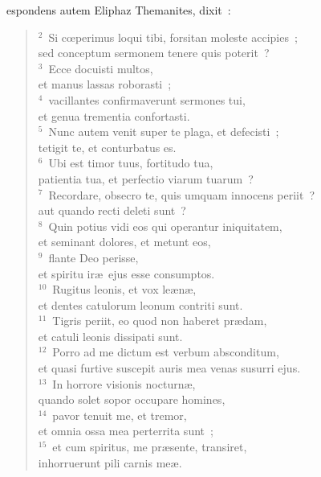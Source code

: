 \bchapter
{}espondens autem Eliphaz Themanites, dixit~:
\begin{flushleft}\begin{verse}\vspace{6pt}${}^{2}$~Si cœperimus loqui tibi, forsitan moleste accipies~;\\ sed conceptum sermonem tenere quis poterit~?\\
${}^{3}$~Ecce docuisti multos,\\ et manus lassas roborasti~;\\
${}^{4}$~vacillantes confirmaverunt sermones tui,\\ et genua trementia confortasti.\\
${}^{5}$~Nunc autem venit super te plaga, et defecisti~;\\ tetigit te, et conturbatus es.\\
${}^{6}$~Ubi est timor tuus, fortitudo tua,\\ patientia tua, et perfectio viarum tuarum~?\\
${}^{7}$~Recordare, obsecro te, quis umquam innocens periit~?\\ aut quando recti deleti sunt~?\\
${}^{8}$~Quin potius vidi eos qui operantur iniquitatem,\\ et seminant dolores, et metunt eos,\\
${}^{9}$~flante Deo perisse,\\ et spiritu ir\ae\ ejus esse consumptos.\\
${}^{10}$~Rugitus leonis, et vox le\ae n\ae ,\\ et dentes catulorum leonum contriti sunt.\\
${}^{11}$~Tigris periit, eo quod non haberet pr\ae dam,\\ et catuli leonis dissipati sunt.\\
${}^{12}$~Porro ad me dictum est verbum absconditum,\\ et quasi furtive suscepit auris mea venas susurri ejus.\\
${}^{13}$~In horrore visionis nocturn\ae ,\\ quando solet sopor occupare homines,\\
${}^{14}$~pavor tenuit me, et tremor,\\ et omnia ossa mea perterrita sunt~;\\
${}^{15}$~et cum spiritus, me pr\ae sente, transiret,\\ inhorruerunt pili carnis me\ae .\\

\end{verse}
\end{flushleft}
